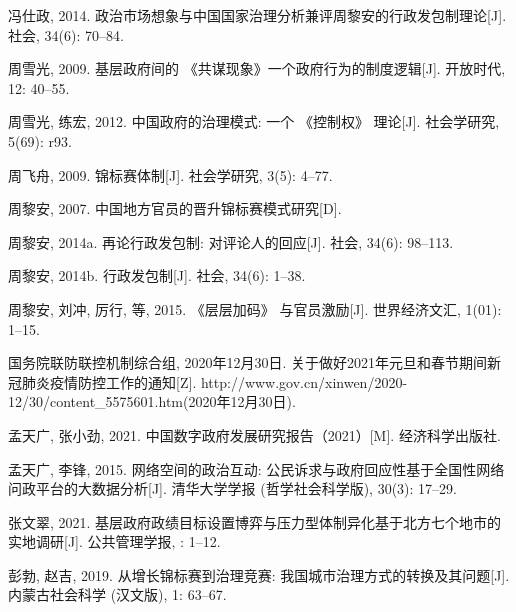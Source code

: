 \documentclass[
  12pt,
]{ctexart}
\newlength{\cslhangindent}
\newlength{\cslentryspacingunit} %
\newenvironment{CSLReferences}[2] %
 {%
  \setlength{\parindent}{0pt}
  \ifodd #1
  \let\oldpar\par
  \def\par{\hangindent=\cslhangindent\oldpar}
  \fi
  \setlength{\parskip}{#2\cslentryspacingunit}
 }%
 {}
\begin{document}
\begin{CSLReferences}{1}{0}
\leavevmode{}%
冯仕政, 2014. 政治市场想象与中国国家治理分析\textemdash\textemdash 兼评周黎安的行政发包制理论{[}J{]}. 社会, 34(6): 70--84.

\leavevmode{}%
周雪光, 2009. 基层政府间的 {《共谋现象》}\textemdash\textemdash 一个政府行为的制度逻辑{[}J{]}. 开放时代, 12: 40--55.

\leavevmode{}%
周雪光, 练宏, 2012. 中国政府的治理模式: 一个 {《控制权》} 理论{[}J{]}. 社会学研究, 5(69): r93.

\leavevmode{}%
周飞舟, 2009. 锦标赛体制{[}J{]}. 社会学研究, 3(5): 4--77.

\leavevmode{}%
周黎安, 2007. 中国地方官员的晋升锦标赛模式研究{[}D{]}.

\leavevmode{}%
周黎安, 2014a. 再论行政发包制: 对评论人的回应{[}J{]}. 社会, 34(6): 98--113.

\leavevmode{}%
周黎安, 2014b. 行政发包制{[}J{]}. 社会, 34(6): 1--38.

\leavevmode{}%
周黎安, 刘冲, 厉行, 等, 2015. {《层层加码》} 与官员激励{[}J{]}. 世界经济文汇, 1(01): 1--15.

\leavevmode{}%
国务院联防联控机制综合组, 2020年12月30日. 关于做好2021年元旦和春节期间新冠肺炎疫情防控工作的通知{[}Z{]}. http://www.gov.cn/xinwen/2020-12/30/content\_5575601.htm(2020年12月30日).

\leavevmode{}%
孟天广, 张小劲, 2021. 中国数字政府发展研究报告（2021）{[}M{]}. {经济科学出版社}.

\leavevmode{}%
孟天广, 李锋, 2015. 网络空间的政治互动: 公民诉求与政府回应性\textemdash\textemdash 基于全国性网络问政平台的大数据分析{[}J{]}. 清华大学学报 (哲学社会科学版), 30(3): 17--29.

\leavevmode{}%
张文翠, 2021. 基层政府政绩目标设置博弈与压力型体制异化\textemdash\textemdash 基于北方七个地市的实地调研{[}J{]}. 公共管理学报, : 1--12.

\leavevmode{}%
彭勃, 赵吉, 2019. 从增长锦标赛到治理竞赛: 我国城市治理方式的转换及其问题{[}J{]}. 内蒙古社会科学 (汉文版), 1: 63--67.


\end{CSLReferences}
\end{document}
